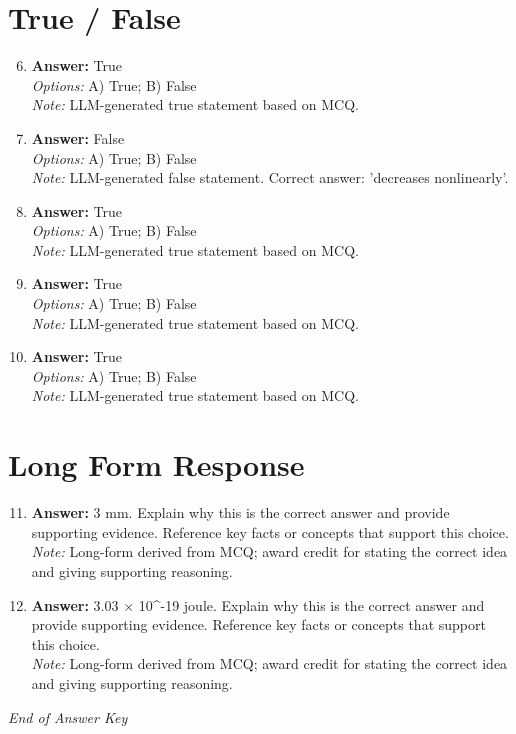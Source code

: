 \documentclass[12pt]{article}
\begin{document}
\section*{True / False}
\begin{enumerate}[label=\arabic*.]
\setcounter{enumi}{5}
\item \textbf{Answer:} True
\\ \textit{Options:} A) True; B) False
\\ \textit{Note:} LLM-generated true statement based on MCQ.
\item \textbf{Answer:} False
\\ \textit{Options:} A) True; B) False
\\ \textit{Note:} LLM-generated false statement. Correct answer: 'decreases nonlinearly'.
\item \textbf{Answer:} True
\\ \textit{Options:} A) True; B) False
\\ \textit{Note:} LLM-generated true statement based on MCQ.
\item \textbf{Answer:} True
\\ \textit{Options:} A) True; B) False
\\ \textit{Note:} LLM-generated true statement based on MCQ.
\item \textbf{Answer:} True
\\ \textit{Options:} A) True; B) False
\\ \textit{Note:} LLM-generated true statement based on MCQ.
\end{enumerate}

\section*{Long Form Response}
\begin{enumerate}[label=\arabic*.]
\setcounter{enumi}{10}
\item \textbf{Answer:} 3 mm. Explain why this is the correct answer and provide supporting evidence. Reference key facts or concepts that support this choice.
\\ \textit{Note:} Long-form derived from MCQ; award credit for stating the correct idea and giving supporting reasoning.
\item \textbf{Answer:} 3.03 \ensuremath{\times} 10^-19 joule. Explain why this is the correct answer and provide supporting evidence. Reference key facts or concepts that support this choice.
\\ \textit{Note:} Long-form derived from MCQ; award credit for stating the correct idea and giving supporting reasoning.
\end{enumerate}

\vfill
\noindent\textit{End of Answer Key}
\end{document}
